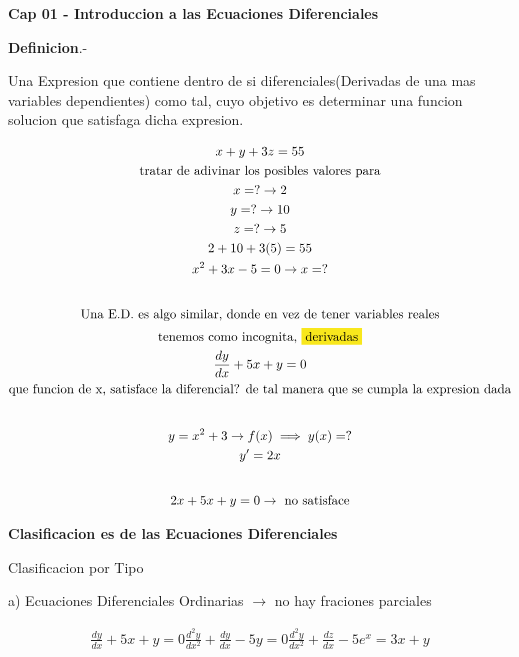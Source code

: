 \documentclass{article}
\begin{document}
\textbf{Cap 01 - Introduccion a las Ecuaciones Diferenciales}

\textbf{Definicion}.-

Una Expresion que contiene dentro de si diferenciales(Derivadas de una mas variables dependientes) como tal, cuyo objetivo es determinar una funcion solucion que satisfaga dicha expresion. 




\begin{gather*}
x+y+3z = 55 \\
\text{tratar de adivinar los posibles valores para} \\
x = ?   \rightarrow   2 \\
y = ?   \rightarrow  10 \\
z = ?   \rightarrow  5 \\
2+10+3(5) = 55 \\
x^{2}+3x-5=0   \rightarrow  x=? \\
\vspace{0.5em} \\
\text{Una E.D. es algo similar, donde en vez de tener variables reales} \\
\text{tenemos como incognita, }\text{\colorbox[RGB]{248,231,28}{$\text{derivadas}$}} \\
\frac{dy}{dx} + 5x + y = 0 \\
\text{que funcion de x, satisface la diferencial? de tal manera que se cumpla la expresion dada} \\
\vspace{0.5em} \\
y = x^{2}+3   \rightarrow  f(x) \implies  y(x)=? \\
y' = 2x \\
\vspace{0.5em} \\
 2x + 5x + y = 0  \rightarrow \text{ no satisface}
\end{gather*}


\textbf{Clasificacion es de las Ecuaciones Diferenciales}

Clasificacion por Tipo

a) Ecuaciones Diferenciales Ordinarias $\rightarrow$  \colorbox[RGB]{248,231,28}{no hay fraciones parciales}


\begin{gather*}
\frac{dy}{dx} + 5x + y = 0         \frac{d^{2}y}{dx^{2}} + \frac{dy}{dx}  - 5y = 0       \frac{d^{2}y}{dx^{2}} + \frac{dz}{dx}  - 5e^{x} = 3x+y 
\end{gather*}
\end{document}
